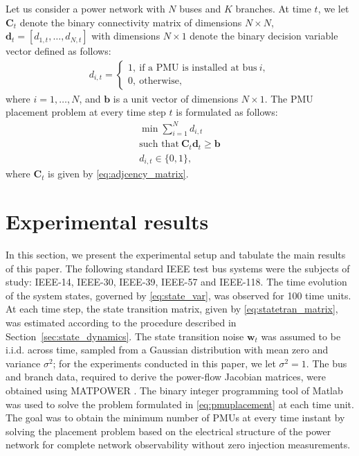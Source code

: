 \documentclass[10pt,journal,twocolumn]{IEEEtran}\IEEEoverridecommandlockouts
\newcommand{\iid}{i.i.d.}
\newcommand{\secref}[1]{Section~\ref{#1}}
\begin{document}
Let us consider a power network with $N$ buses and $K$ branches. At time $t$, we let $\bm{C}_t$ denote the binary connectivity matrix of dimensions $N\times N$, $\bm{d}_t = [d_{1,t},\dots,d_{N,t}]$ with dimensions $N\times 1$ denote the binary decision variable vector defined as follows:
\begin{eqnarray}\label{eq:binarydecision_vector}
d_{i,t} = \begin{cases}
1, ~\text{if a PMU is installed at bus}~i,\\
0, ~\text{otherwise},
\end{cases}
\end{eqnarray}
where $i=1,\dots,N$, and $\bm{b}$ is a unit vector of dimensions $N\times 1$. The PMU placement problem at every time step $t$ is formulated as follows:
\begin{eqnarray}\label{eq:pmuplacement}
\nonumber \min \sum_{i=1}^{N}d_{i,t}\\
\text{such that}~ \bm{C}_t\bm{d}_t \geq \bm{b}\\
\nonumber d_{i,t} \in \{0,1\},
\end{eqnarray}
where $\bm{C}_t$ is given by \eqref{eq:adjcency_matrix}.

\section{Experimental results}\label{sec:results}
In this section, we present the experimental setup and tabulate the main results of this paper. The following standard IEEE test bus systems were the subjects of study: IEEE-14, IEEE-30, IEEE-39, IEEE-57 and IEEE-118. The time evolution of the system states, governed by \eqref{eq:state_var}, was observed for 100 time units. At each time step, the state transition matrix, given by \eqref{eq:statetran_matrix}, was estimated according to the procedure described in \secref{sec:state_dynamics}. The state transition noise $\boldsymbol{w}_{t}$ was assumed to be {\iid} across time, sampled from a Gaussian distribution with mean zero and variance $\sigma^2$; for the experiments conducted in this paper, we let $\sigma^2 = 1$. The bus and branch data, required to derive the power-flow Jacobian matrices, were obtained using MATPOWER \cite{Zimmerman2011}. The binary integer programming tool of Matlab was used to solve the problem formulated in \eqref{eq:pmuplacement} at each time unit. The goal was to obtain the minimum number of PMUs at every time instant by solving the placement problem based on the electrical structure of the power network for complete network observability without zero injection measurements.
\end{document}
